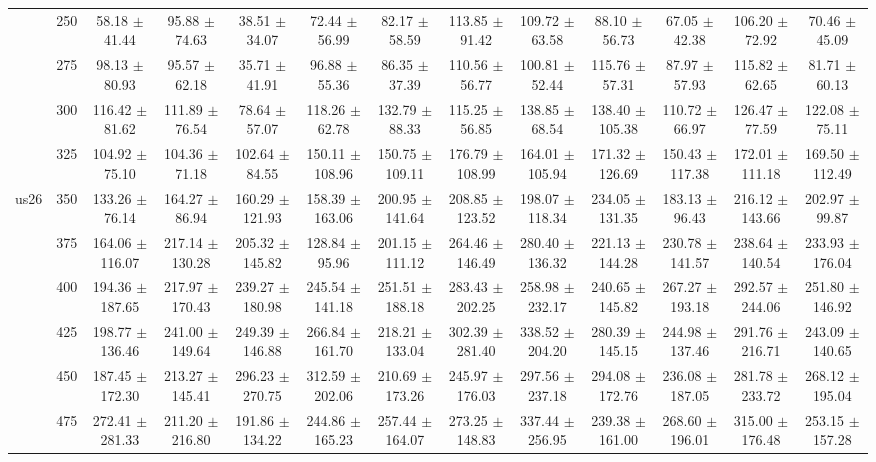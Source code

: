 \begin{table}[h]
{\begin{tabular}{
        ccccccccccccc}
 & 250& 58.18 $\pm$ 41.44& 95.88 $\pm$ 74.63& 38.51 $\pm$ 34.07& 72.44 $\pm$ 56.99& 82.17 $\pm$ 58.59& 113.85 $\pm$ 91.42& 109.72 $\pm$ 63.58& 88.10 $\pm$ 56.73& 67.05 $\pm$ 42.38& 106.20 $\pm$ 72.92& 70.46 $\pm$ 45.09 \\ 
 & 275& 98.13 $\pm$ 80.93& 95.57 $\pm$ 62.18& 35.71 $\pm$ 41.91& 96.88 $\pm$ 55.36& 86.35 $\pm$ 37.39& 110.56 $\pm$ 56.77& 100.81 $\pm$ 52.44& 115.76 $\pm$ 57.31& 87.97 $\pm$ 57.93& 115.82 $\pm$ 62.65& 81.71 $\pm$ 60.13 \\ 
 & 300& 116.42 $\pm$ 81.62& 111.89 $\pm$ 76.54& 78.64 $\pm$ 57.07& 118.26 $\pm$ 62.78& 132.79 $\pm$ 88.33& 115.25 $\pm$ 56.85& 138.85 $\pm$ 68.54& 138.40 $\pm$ 105.38& 110.72 $\pm$ 66.97& 126.47 $\pm$ 77.59& 122.08 $\pm$ 75.11 \\ 
 & 325& 104.92 $\pm$ 75.10& 104.36 $\pm$ 71.18& 102.64 $\pm$ 84.55& 150.11 $\pm$ 108.96& 150.75 $\pm$ 109.11& 176.79 $\pm$ 108.99& 164.01 $\pm$ 105.94& 171.32 $\pm$ 126.69& 150.43 $\pm$ 117.38& 172.01 $\pm$ 111.18& 169.50 $\pm$ 112.49 \\ 
\multirow{4}{*}{us26}& 350& 133.26 $\pm$ 76.14& 164.27 $\pm$ 86.94& 160.29 $\pm$ 121.93& 158.39 $\pm$ 163.06& 200.95 $\pm$ 141.64& 208.85 $\pm$ 123.52& 198.07 $\pm$ 118.34& 234.05 $\pm$ 131.35& 183.13 $\pm$ 96.43& 216.12 $\pm$ 143.66& 202.97 $\pm$ 99.87 \\ 
 & 375& 164.06 $\pm$ 116.07& 217.14 $\pm$ 130.28& 205.32 $\pm$ 145.82& 128.84 $\pm$ 95.96& 201.15 $\pm$ 111.12& 264.46 $\pm$ 146.49& 280.40 $\pm$ 136.32& 221.13 $\pm$ 144.28& 230.78 $\pm$ 141.57& 238.64 $\pm$ 140.54& 233.93 $\pm$ 176.04 \\ 
 & 400& 194.36 $\pm$ 187.65& 217.97 $\pm$ 170.43& 239.27 $\pm$ 180.98& 245.54 $\pm$ 141.18& 251.51 $\pm$ 188.18& 283.43 $\pm$ 202.25& 258.98 $\pm$ 232.17& 240.65 $\pm$ 145.82& 267.27 $\pm$ 193.18& 292.57 $\pm$ 244.06& 251.80 $\pm$ 146.92 \\ 
 & 425& 198.77 $\pm$ 136.46& 241.00 $\pm$ 149.64& 249.39 $\pm$ 146.88& 266.84 $\pm$ 161.70& 218.21 $\pm$ 133.04& 302.39 $\pm$ 281.40& 338.52 $\pm$ 204.20& 280.39 $\pm$ 145.15& 244.98 $\pm$ 137.46& 291.76 $\pm$ 216.71& 243.09 $\pm$ 140.65 \\ 
 & 450& 187.45 $\pm$ 172.30& 213.27 $\pm$ 145.41& 296.23 $\pm$ 270.75& 312.59 $\pm$ 202.06& 210.69 $\pm$ 173.26& 245.97 $\pm$ 176.03& 297.56 $\pm$ 237.18& 294.08 $\pm$ 172.76& 236.08 $\pm$ 187.05& 281.78 $\pm$ 233.72& 268.12 $\pm$ 195.04 \\ 
 & 475& 272.41 $\pm$ 281.33& 211.20 $\pm$ 216.80& 191.86 $\pm$ 134.22& 244.86 $\pm$ 165.23& 257.44 $\pm$ 164.07& 273.25 $\pm$ 148.83& 337.44 $\pm$ 256.95& 239.38 $\pm$ 161.00& 268.60 $\pm$ 196.01& 315.00 $\pm$ 176.48& 253.15 $\pm$ 157.28 \\ 

\end{tabular}}
\end{table}
